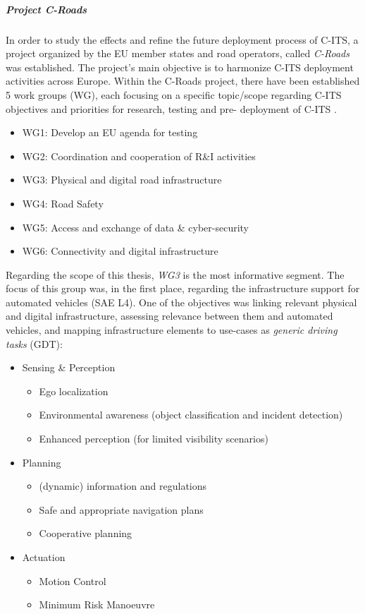 \documentclass[main.tex]{subfiles}
\begin{document}
\subparagraph{Project C-Roads}

In order to study the effects and refine the future deployment process of C-ITS, a project 
organized by the EU member states and road operators, called \emph{C-Roads} was established. 
The project's main objective is to harmonize C-ITS deployment activities across Europe. 
Within the C-Roads project, there have been established 5 work groups (WG), each focusing on a 
specific topic/scope regarding C-ITS objectives and priorities for research, testing and pre-
deployment of C-ITS \cite{Commision2021}. 

\begin{itemize}
    \item WG1: Develop an EU agenda for testing
    \item WG2: Coordination and cooperation of R\&I activities
    \item WG3: Physical and digital road infrastructure
    \item WG4: Road Safety
    \item WG5: Access and exchange of data \& cyber-security
    \item WG6: Connectivity and digital infrastructure
\end{itemize}

Regarding the scope of this thesis, \emph{WG3} is the most informative segment. The focus of this group 
was, in the first place, regarding the infrastructure support for automated vehicles (SAE L4). One of 
the objectives was linking relevant physical and digital infrastructure, assessing relevance between 
them and automated vehicles, and mapping infrastructure elements to use-cases as \emph{generic driving 
tasks} (GDT):

\begin{itemize}
    \item Sensing \& Perception
    \begin{itemize}
        \item Ego localization
        \item Environmental awareness (object classification and incident detection)
        \item Enhanced perception (for limited visibility scenarios)
    \end{itemize}
    \item Planning
    \begin{itemize}
        \item (dynamic) information and regulations
        \item Safe and appropriate navigation plans
        \item Cooperative planning
    \end{itemize}
    \item Actuation
    \begin{itemize}
        \item Motion Control
        \item Minimum Risk Manoeuvre
    \end{itemize}
\end{itemize}
\end{document}
